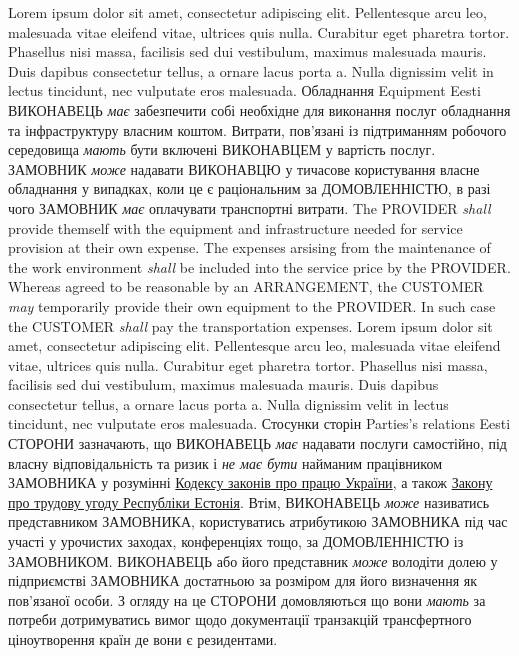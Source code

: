 \begin{Form}
\begin{paracol}{3}
        {Lorem ipsum dolor sit amet, consectetur adipiscing elit. Pellentesque arcu leo, malesuada vitae eleifend vitae, ultrices quis nulla. Curabitur eget pharetra tortor. Phasellus nisi massa, facilisis sed dui vestibulum, maximus malesuada mauris. Duis dapibus consectetur tellus, a ornare lacus porta a. Nulla dignissim velit in lectus tincidunt, nec vulputate eros malesuada. }
      \clause
        {Обладнання}
        {Equipment}
        {Eesti}
        {ВИКОНАВЕЦЬ \textit{має} забезпечити собі необхідне для виконання послуг обладнання та інфраструктуру власним коштом. Витрати, пов’язані із підтриманням робочого середовища \textit{мають} бути включені ВИКОНАВЦЕМ у вартість послуг. ЗАМОВНИК \textit{може} надавати ВИКОНАВЦЮ у тичасове користування власне обладнання у випадках, коли це є раціональним за ДОМОВЛЕННІСТЮ, в разі чого ЗАМОВНИК \textit{має} оплачувати транспортні витрати.}
        {The PROVIDER \textit{shall} provide themself with the equipment and infrastructure needed for service provision at their own expense. The expenses arsising from the maintenance of the work environment \textit{shall} be included into the service price by the PROVIDER. Whereas agreed to be reasonable by an ARRANGEMENT, the CUSTOMER \textit{may} temporarily provide their own equipment to the PROVIDER. In such case the CUSTOMER \textit{shall} pay the transportation expenses. }
        {Lorem ipsum dolor sit amet, consectetur adipiscing elit. Pellentesque arcu leo, malesuada vitae eleifend vitae, ultrices quis nulla. Curabitur eget pharetra tortor. Phasellus nisi massa, facilisis sed dui vestibulum, maximus malesuada mauris. Duis dapibus consectetur tellus, a ornare lacus porta a. Nulla dignissim velit in lectus tincidunt, nec vulputate eros malesuada. }
      \freetext{\pagebreak}{\pagebreak}{\pagebreak}  %
      \clause
        {Стосунки сторін}
        {Parties's relations}
        {Eesti}
        {СТОРОНИ зазначають, що ВИКОНАВЕЦЬ \textit{має} надавати послуги самостійно, під власну відповідальність та ризик і \textit{не має бути} найманим працівником ЗАМОВНИКА у розумінні \href{http://zakon2.rada.gov.ua/laws/show/322-08}{Кодексу законів про працю України}, а також \href{http://zakon24.ee/zakon-o-trudovom-dogovore/}{Закону про трудову угоду Республіки Естонія}. Втім, ВИКОНАВЕЦЬ \textit{може} називатись представником ЗАМОВНИКА, користуватись атрибутикою ЗАМОВНИКА під час участі у урочистих заходах, конференціях тощо, за ДОМОВЛЕННІСТЮ із ЗАМОВНИКОМ. ВИКОНАВЕЦЬ або його представник \textit{може} володіти долею у підприємстві ЗАМОВНИКА достатньою за розміром для його визначення як пов’язаної особи. З огляду на це СТОРОНИ домовляються що вони \textit{мають} за потреби дотримуватись вимог щодо документації транзакцій трансфертного ціноутворення країн де вони є резидентами.}

\end{paracol}
\end{Form}
